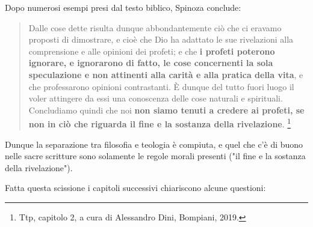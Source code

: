 Dopo numerosi esempi presi dal testo biblico, Spinoza conclude:

\begin{quotation}
	\small Dalle cose dette risulta dunque abbondantemente ciò che ci eravamo proposti di
	dimostrare, e cioè che Dio ha adattato le sue rivelazioni alla comprensione e alle opinioni dei
	profeti; e che \textbf{i profeti poterono ignorare, e ignorarono di fatto, le cose concernenti la sola
	speculazione e non attinenti alla carità e alla pratica della vita}, e che professarono opinioni
	contrastanti. È dunque del tutto fuori luogo il voler attingere da essi una conoscenza delle cose
	naturali e spirituali. Concludiamo quindi che noi \textbf{non siamo tenuti a credere ai profeti, se non in ciò
	che riguarda il fine e la sostanza della rivelazione}. \footnote{Ttp, capitolo 2, a cura di Alessandro Dini, Bompiani, 2019.}
\end{quotation}

Dunque la separazione tra filosofia e teologia è compiuta, e quel che c'è di buono nelle sacre scritture sono solamente le regole morali presenti ("il fine e la sostanza della rivelazione").

Fatta questa scissione i capitoli successivi chiariscono alcune questioni:

